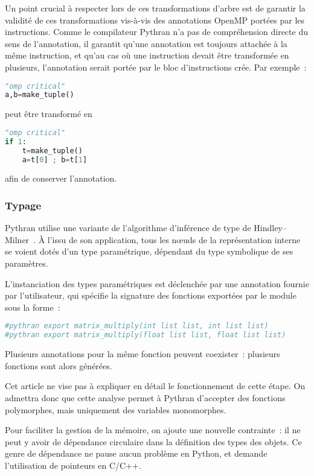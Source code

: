 \documentclass[renpar]{compas2013}
\begin{document}
Un point crucial à respecter lors de ces transformations d'arbre est de
garantir la validité de ces transformations vis-à-vis des annotations
OpenMP portées par les instructions. Comme le compilateur Pythran n'a pas
de compréhension directe du sens de l'annotation, il garantit qu'une
annotation est toujours attachée à la même instruction, et qu'au cas où
une instruction devait être transformée en plusieurs, l'annotation serait
portée par le bloc d'instructions crée. Par exemple~:
%
\begin{lstlisting}[language=python]
"omp critical"
a,b=make_tuple()
\end{lstlisting}
%
\noindent peut être transformé en
\begin{lstlisting}[language=python]
"omp critical"
if 1:
	t=make_tuple()
	a=t[0] ; b=t[1]
\end{lstlisting}
%
\noindent afin de conserver l'annotation.

\subsubsection{Typage}

Pythran utilise une variante de l'algorithme d'inférence de type de
Hindley--Milner~\cite{milner78}. À l'issu de son application, tous les
nœuds de la représentation interne se voient dotés d'un type paramétrique,
dépendant du type symbolique de ses paramètres.

L'instanciation des types paramétriques est déclenchée par une annotation
fournie par l'utilisateur, qui spécifie la signature des fonctions
exportées par le module sous la forme~:
%
\begin{lstlisting}[language=python]
#pythran export matrix_multiply(int list list, int list list)
#pythran export matrix_multiply(float list list, float list list)
\end{lstlisting}
%
Plusieurs annotations pour la même fonction peuvent coexister~: plusieurs
fonctions sont alors générées.

Cet article ne vise pas à expliquer en détail le fonctionnement de cette
étape. On admettra donc que cette analyse permet à Pythran d'accepter des
fonctions polymorphes, mais uniquement des variables monomorphes.

Pour faciliter la gestion de la mémoire, on ajoute une nouvelle
contrainte~: il ne peut y avoir de dépendance circulaire dans la
définition des types des objets. Ce genre de dépendance ne pause aucun
problème en Python, et demande l'utilisation de pointeurs en C/C++.
\end{document}
